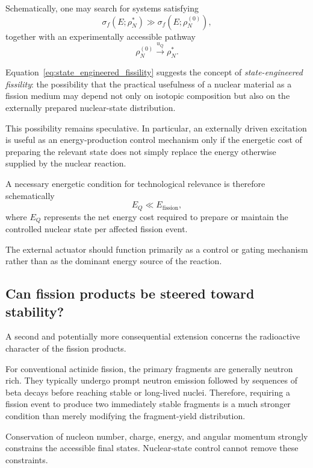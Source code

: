 Schematically, one may search for systems satisfying
\begin{equation}
\sigma_f(E;\rho_N^\ast)
\gg
\sigma_f(E;\rho_N^{(0)}),
\label{eq:state_engineered_fissility}
\end{equation}
together with an experimentally accessible pathway
\begin{equation}
\rho_N^{(0)}
\overset{u_Q}{\longrightarrow}
\rho_N^\ast.
\end{equation}

Equation~\eqref{eq:state_engineered_fissility} suggests the concept of \emph{state-engineered fissility}: the possibility that the practical usefulness of a nuclear material as a fission medium may depend not only on isotopic composition but also on the externally prepared nuclear-state distribution.

This possibility remains speculative. In particular, an externally driven excitation is useful as an energy-production control mechanism only if the energetic cost of preparing the relevant state does not simply replace the energy otherwise supplied by the nuclear reaction.

A necessary energetic condition for technological relevance is therefore schematically
\begin{equation}
E_Q
\ll
E_{\mathrm{fission}},
\end{equation}
where $E_Q$ represents the net energy cost required to prepare or maintain the controlled nuclear state per affected fission event.

The external actuator should function primarily as a control or gating mechanism rather than as the dominant energy source of the reaction.

\subsection{Can fission products be steered toward stability?}

A second and potentially more consequential extension concerns the radioactive character of the fission products.

For conventional actinide fission, the primary fragments are generally neutron rich. They typically undergo prompt neutron emission followed by sequences of beta decays before reaching stable or long-lived nuclei. Therefore, requiring a fission event to produce two immediately stable fragments is a much stronger condition than merely modifying the fragment-yield distribution.

Conservation of nucleon number, charge, energy, and angular momentum strongly constrains the accessible final states. Nuclear-state control cannot remove these constraints.

